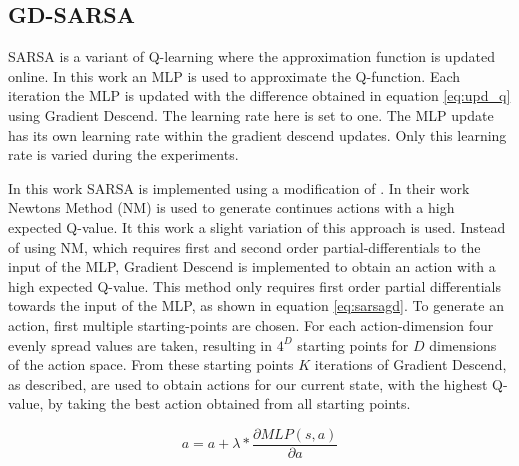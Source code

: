 
\subsection{GD-SARSA}
SARSA is a variant of Q-learning where the approximation function is updated online. In this work an MLP is used to approximate the Q-function. Each iteration the MLP is updated with the difference obtained in equation \eqref{eq:upd_q} using Gradient Descend. The learning rate here is set to one. The MLP update has its own learning rate within the gradient descend updates. Only this learning rate is varied during the experiments. 

In this work SARSA is implemented using a modification of \cite{nichols2015continuous}. In their work Newtons Method (NM) is used to generate continues actions with a high expected Q-value.
It this work a slight variation of this approach is used. Instead of using NM, which requires first and second order partial-differentials to the input of the MLP, Gradient Descend is implemented to obtain an action with a high expected Q-value. This method only requires first order partial differentials towards the input of the MLP, as shown in equation \eqref{eq:sarsagd}.
To generate an action, first multiple starting-points are chosen. For each action-dimension four evenly spread values are taken, resulting in $4 ^ D$ starting points for $D$ dimensions of the action space. From these starting points $K$ iterations of Gradient Descend, as described, are used to obtain actions for our current state, with the highest Q-value, by taking the best action obtained from all starting points.


\begin{equation}
\label{eq:sarsagd}
a = a + \lambda * \frac{\partial MLP(s,a)}{\partial a}
\end{equation}
